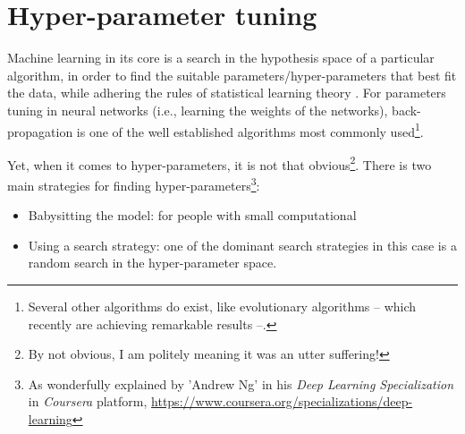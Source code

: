 \chapter{Hyper-parameter tuning}
\par Machine learning in its core is a search in the hypothesis space of a particular algorithm, in order to find the suitable parameters/hyper-parameters that best fit the data, while adhering the rules of statistical learning theory \citep{hastie01statisticallearning}. For parameters tuning in neural networks (i.e., learning the weights of the networks), back-propagation \citep{rumelhart1988learning} is one of the well established algorithms most commonly used\footnote{Several other algorithms do exist, like evolutionary algorithms \citep{eiben2003introduction} -- which recently are achieving remarkable results --.}.

\par Yet, when it comes to hyper-parameters, it is not that obvious\footnote{By not obvious, I am politely meaning it was an utter suffering!}. There is two main strategies for finding hyper-parameters\footnote{As wonderfully explained by 'Andrew Ng' in his \textit{Deep Learning Specialization} in \textit{Coursera} platform, \url{https://www.coursera.org/specializations/deep-learning}}:
\begin{itemize}
  \item Babysitting the model: for people with small computational
  \item Using a search strategy: one of the dominant search strategies in this case is a random search in the hyper-parameter space.
\end{itemize}
